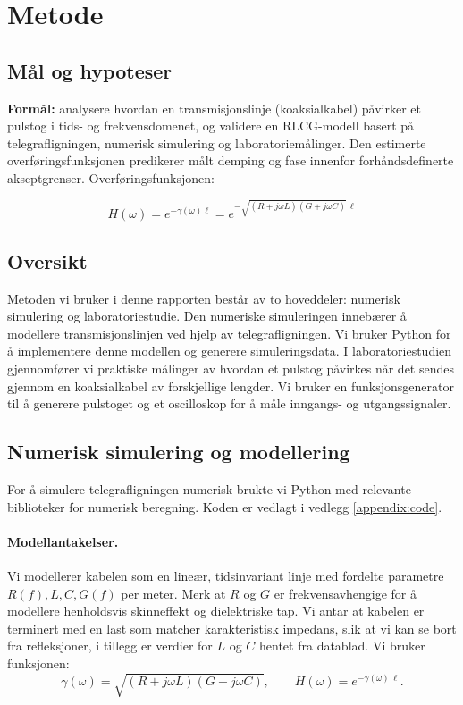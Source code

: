\section{Metode}

\subsection{Mål og hypoteser}
\textbf{Formål:} analysere hvordan en transmisjonslinje (koaksialkabel) påvirker et pulstog i tids- og frekvensdomenet, og validere en RLCG-modell basert på telegrafligningen, numerisk simulering og laboratoriemålinger. Den estimerte overføringsfunksjonen predikerer målt demping og fase innenfor forhåndsdefinerte akseptgrenser. Overføringsfunksjonen:

\[
H(\omega) = e^{-\gamma(\omega)\ell} = e^{-\sqrt{(R+j\omega L)(G+j\omega C)}\,\ell}
\]

\subsection{Oversikt}
Metoden vi bruker i denne rapporten består av to hoveddeler: numerisk simulering og laboratoriestudie. Den numeriske simuleringen innebærer å modellere transmisjonslinjen ved hjelp av telegrafligningen. Vi bruker Python for å implementere denne modellen og generere simuleringsdata. I laboratoriestudien gjennomfører vi praktiske målinger av hvordan et pulstog påvirkes når det sendes gjennom en koaksialkabel av forskjellige lengder. Vi bruker en funksjonsgenerator til å generere pulstoget og et oscilloskop for å måle inngangs- og utgangssignaler.

\subsection{Numerisk simulering og modellering}
For å simulere telegrafligningen numerisk brukte vi Python med relevante biblioteker for numerisk beregning. Koden er vedlagt i vedlegg \ref{appendix:code}.

\paragraph{Modellantakelser.}
Vi modellerer kabelen som en lineær, tidsinvariant linje med fordelte parametre $R(f),L,C,G(f)$ per meter. Merk at $R$ og $G$ er frekvensavhengige for å modellere henholdsvis skinneffekt og dielektriske tap. Vi antar at kabelen er terminert med en last som matcher karakteristisk impedans, slik at vi kan se bort fra refleksjoner, i tillegg er verdier for $L$ og $C$ hentet fra datablad. Vi bruker funksjonen:
\[
\gamma(\omega)=\sqrt{(R+j\omega L)(G+j\omega C)},\qquad
H(\omega)=e^{-\gamma(\omega)\,\ell}.
\]

